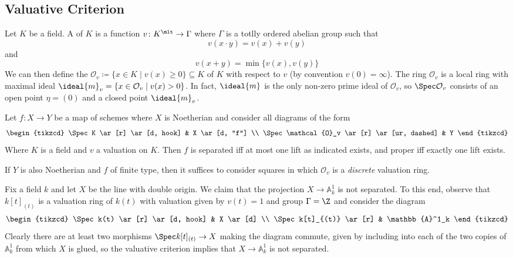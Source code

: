 \documentclass[wip, algebra]{bsteffan-lecturenotes}
\newcommand{\cO}{\mathcal{O}}
\newcommand{\A}{\mathbb{A}}
\begin{document}
\subsection{Valuative Criterion}
Let $K$ be a field.
A  of $K$ is a function $v\colon K^\mlt \to \Gamma$ where $\Gamma$ is a totlly ordered abelian group such that
\begin{equation*}
	v(x \cdot y) = v(x) + v(y)
\end{equation*}
and
\begin{equation*}
	v(x + y) = \min \{v(x), v(y)\}
\end{equation*}
We can then define the  $\cO_v \coloneq \{x \in K \mid v(x) \geq 0\} \subseteq K$ of $K$ with respect to $v$ (by convention $v(0) = \infty$).
The ring $\cO_v$ is a local ring with maximal ideal $\ideal{m}_v = \{x \in \cO_v \mid v(x) > 0\}$.
In fact, $\ideal{m}$ is the only non-zero prime ideal of $\cO_v$, so $\Spec \cO_v$ consists of an open point $\eta = (0)$ and a closed point $\ideal{m}_v$.
\begin{theorem}
	Let $f\colon X \to Y$ be a map of schemes where $X$ is Noetherian and consider all diagrams of the form
	\begin{equation*}
		\begin{tikzcd}
			\Spec K
					\ar[r]
					\ar[d, hook]
				& X
					\ar[d, "f"]
			\\
			\Spec \cO_v
					\ar[r]
					\ar[ur, dashed]
				& Y
		\end{tikzcd}
	\end{equation*}
	Where $K$ is a field and $v$ a valuation on $K$.
	Then $f$ is separated iff at most one lift as indicated exists, and proper iff exactly one lift exists.
\end{theorem}
\begin{remark}
	If $Y$ is also Noetherian and $f$ of finite type, then it suffices to consider squares in which $\cO_v$ is a \emph{discrete} valuation ring.
\end{remark}
\begin{example}
	Fix a field $k$ and let $X$ be the line with double origin.
	We claim that the projection $X \to \A^1_k$ is not separated.
	To this end, observe that $k[t]_{(t)}$ is a valuation ring of $k(t)$ with valuation given by $v(t) = 1$ and group $\Gamma = \Z$ and consider the diagram
	\begin{equation*}
		\begin{tikzcd}
			\Spec k(t)
					\ar[r]
					\ar[d, hook]
				& X
					\ar[d]
			\\
			\Spec k[t]_{(t)}
					\ar[r]
				& \A^1_k
		\end{tikzcd}
	\end{equation*}
	Clearly there are at least two morphisms $\Spec k[t]_{(t)} \to X$ making the diagram commute, given by including into each of the two copies of $\A^1_k$ from which $X$ is glued, so the valuative criterion implies that $X \to \A^1_k$ is not separated.
\end{example}
\end{document}
